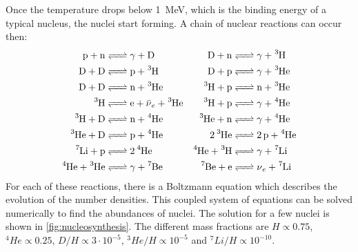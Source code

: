 Once the temperature drops below \SI{1}{\MeV}, which is the binding energy of a typical nucleus, the nuclei start forming. A chain of nuclear reactions can occur then:
\begin{align*}
	\ce{p + n &<=> \gamma{} + D} &
	\ce{D + n &<=> \gamma{} + ^3H} \\
	\ce{D + D &<=> p + ^3H} &
	\ce{D + p &<=> \gamma{} + ^3He} \\
	\ce{D + D &<=> n + ^3He} &
	\ce{^3H + p &<=> n + ^3He} \\
	\ce{^3H &<=> e + \bar{\nu}_e + ^3He} &
	\ce{^3H + p &<=> \gamma{} + ^4He} \\
	\ce{^3H + D &<=> n + ^4He} & 
	\ce{^3He + n &<=> \gamma{} + ^4He} \\
	\ce{^3He + D &<=> p + ^4He} &
	\ce{2 ^3He &<=> 2p + ^4He} \\
	\ce{^7Li + p &<=> 2 ^4He} &
	\ce{^4He + ^3H &<=> \gamma{} + ^7Li} \\
	\ce{^4He + ^3He &<=> \gamma{} + ^7Be} &
	\ce{^7Be + e &<=> \nu_e + ^7Li}
\end{align*}
For each of these reactions, there is a Boltzmann equation which describes the evolution of the number densities. This coupled system of equations can be solved numerically to find the abundances of nuclei. The solution for a few nuclei is shown in \cref{fig:nucleosynthesis}. The different mass fractions are $H \propto 0.75$, $ ^4He \propto 0.25$, $D/H \propto 3\cdot 10^{-5}$, $ ^3He/H \propto 10^{-5}$ and $ ^7Li/H \propto 10^{-10}$.


